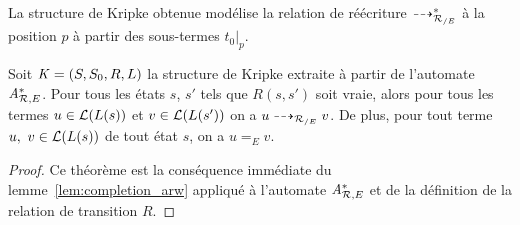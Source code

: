 La structure de Kripke obtenue modélise la relation de réécriture $\dashrightarrow_{\mathcal R_{/E}}^*$ 
à la position $p$ à partir des sous-termes $t_0|_p$.

\begin{theorem}
  Soit $\mathit K=(S, S_0, R, L)$ la structure de Kripke extraite à partir de l'automate ${\mathit A}_{\mathcal R,E}^*$.
  Pour tous les états $s$, $s'$ tels que $R(s, s')$ soit vraie, alors pour tous les termes
  $u \in \mathcal{L}(L(s))$ et $v \in \mathcal{L}(L(s'))$ on a  $u \dashrightarrow_{{\mathcal R_{/E}}} v$. De plus, pour tout terme $u,\ v \in \mathcal{L}(L(s))$
  de tout état $s$, on a $u =_E v$.
\end{theorem}

\begin{proof}
  Ce théorème est la conséquence immédiate du lemme~\ref{lem:completion_arw} 
  appliqué à l'automate ${\mathit A}_{\mathcal R,E}^*$ et de la définition de la relation de transition $R$.
\end{proof}



